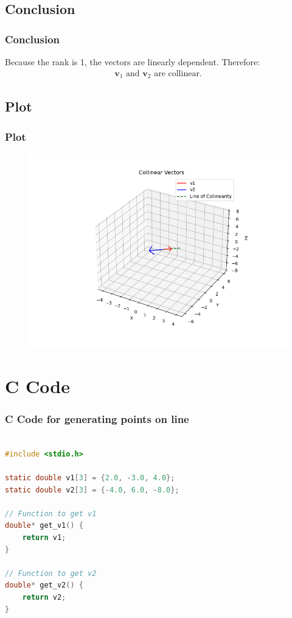 \documentclass{beamer}
\theoremstyle{remark}
\let\vec\mathbf
\numberwithin{equation}{section}
\begin{document}
\subsection{Conclusion}
\begin{frame}
\frametitle{Conclusion}

Because the rank is 1, the vectors are linearly dependent. Therefore:
\begin{align}
\vec{v}_1 \text{ and } \vec{v}_2 \text{ are collinear.}
\end{align}

\end{frame}

\subsection{Plot}
\begin{frame}[fragile]
\frametitle{Plot}

\begin{figure}[H]
   \centering
   \includegraphics[width=0.8\columnwidth]{figs/fig1.png}
	\caption{}
   \label{stemplot}
\end{figure}
\end{frame}

\section{C Code}
\begin{frame}[fragile]
\frametitle{C Code for generating points on line}
\begin{lstlisting}[language=C]

#include <stdio.h>

static double v1[3] = {2.0, -3.0, 4.0};
static double v2[3] = {-4.0, 6.0, -8.0};

// Function to get v1
double* get_v1() {
    return v1;
}

// Function to get v2
double* get_v2() {
    return v2;
}

 
    \end{lstlisting}
\end{frame}
\end{document}
